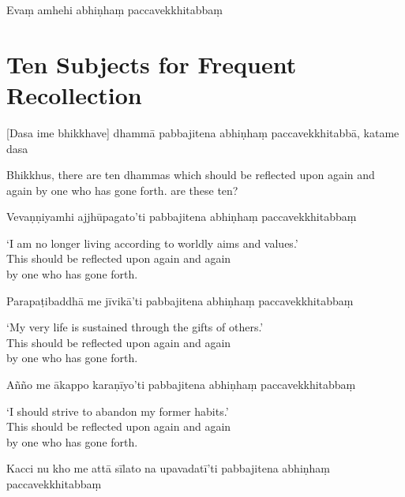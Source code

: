 Evaṃ amhehi abhiṇhaṃ paccavekkhitabbaṃ


\section{Ten Subjects for Frequent Recollection}


\begin{leader}
\end{leader}

[Dasa ime bhikkhave] dhammā pabbajitena abhiṇhaṃ paccavekkhitabbā, katame dasa

\begin{english}
  Bhikkhus, there are ten dhammas which should be reflected upon again and again by one who has gone forth.  are these ten?
\end{english}

Vevaṇṇiyamhi ajjhūpagato'ti pabbajitena abhiṇhaṃ paccavekkhitabbaṃ

\begin{english}
  `I am no longer living according to worldly aims and values.'\\
  This should be reflected upon again and again\\
  by one who has gone forth.
\end{english}

Parapaṭibaddhā me jīvikā'ti pabbajitena abhiṇhaṃ paccavekkhitabbaṃ

\begin{english}
  `My very life is sustained through the gifts of others.'\\
  This should be reflected upon again and again\\
  by one who has gone forth.
\end{english}

Añño me ākappo karaṇīyo'ti pabbajitena abhiṇhaṃ paccavekkhitabbaṃ

\begin{english}
  `I should strive to abandon my former habits.'\\
  This should be reflected upon again and again\\
  by one who has gone forth.
\end{english}

\clearpage

Kacci nu kho me attā sīlato na upavadatī'ti pabbajitena abhiṇhaṃ paccavekkhitabbaṃ

